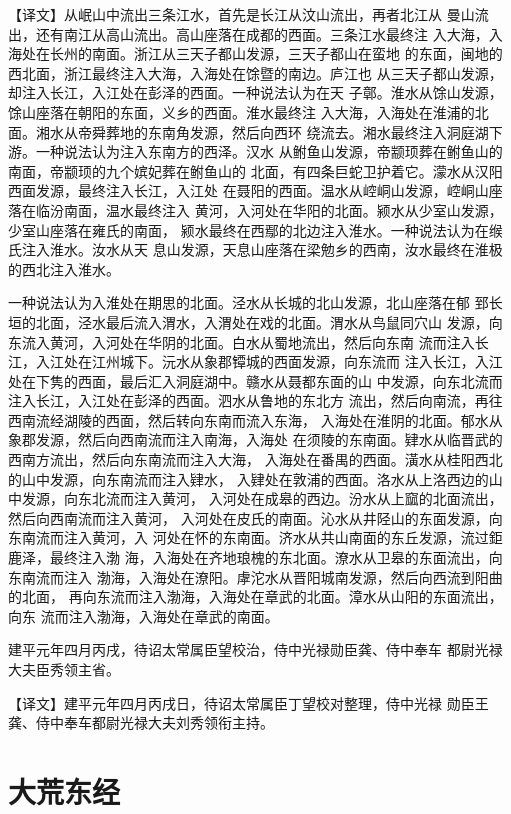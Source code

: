 \documentclass[a4paper,12pt,UTF8,twoside]{ctexbook}
\begin{document}
【译文】从岷山中流出三条江水，首先是长江从汶山流出，再者北江从 曼山流出，还有南江从高山流出。高山座落在成都的西面。三条江水最终注 入大海，入海处在长州的南面。浙江从三天子都山发源，三天子都山在蛮地 的东面，闽地的西北面，浙江最终注入大海，入海处在馀暨的南边。庐江也 从三天子都山发源，却注入长江，入江处在彭泽的西面。一种说法认为在天 子鄣。淮水从馀山发源，馀山座落在朝阳的东面，义乡的西面。淮水最终注 入大海，入海处在淮浦的北面。湘水从帝舜葬地的东南角发源，然后向西环 绕流去。湘水最终注入洞庭湖下游。一种说法认为注入东南方的西泽。汉水 从鲋鱼山发源，帝颛顼葬在鲋鱼山的南面，帝颛顼的九个嫔妃葬在鲋鱼山的 北面，有四条巨蛇卫护着它。濛水从汉阳西面发源，最终注入长江，入江处 在聂阳的西面。温水从崆峒山发源，崆峒山座落在临汾南面，温水最终注入 黄河，入河处在华阳的北面。颍水从少室山发源，少室山座落在雍氏的南面， 颍水最终在西鄢的北边注入淮水。一种说法认为在缑氏注入淮水。汝水从天 息山发源，天息山座落在梁勉乡的西南，汝水最终在淮极的西北注入淮水。

一种说法认为入淮处在期思的北面。泾水从长城的北山发源，北山座落在郁 郅长垣的北面，泾水最后流入渭水，入渭处在戏的北面。渭水从鸟鼠同穴山 发源，向东流入黄河，入河处在华阴的北面。白水从蜀地流出，然后向东南 流而注入长江，入江处在江州城下。沅水从象郡镡城的西面发源，向东流而 注入长江，入江处在下隽的西面，最后汇入洞庭湖中。赣水从聂都东面的山 中发源，向东北流而注入长江，入江处在彭泽的西面。泗水从鲁地的东北方 流出，然后向南流，再往西南流经湖陵的西面，然后转向东南而流入东海， 入海处在淮阴的北面。郁水从象郡发源，然后向西南流而注入南海，入海处 在须陵的东南面。肄水从临晋武的西南方流出，然后向东南流而注入大海， 入海处在番禺的西面。潢水从桂阳西北的山中发源，向东南流而注入肄水， 入肄处在敦浦的西面。洛水从上洛西边的山中发源，向东北流而注入黄河， 入河处在成皋的西边。汾水从上窳的北面流出，然后向西南流而注入黄河， 入河处在皮氏的南面。沁水从井陉山的东面发源，向东南流而注入黄河，入 河处在怀的东南面。济水从共山南面的东丘发源，流过鉅鹿泽，最终注入渤 海，入海处在齐地琅槐的东北面。潦水从卫皋的东面流出，向东南流而注入 渤海，入海处在潦阳。虖沱水从晋阳城南发源，然后向西流到阳曲的北面， 再向东流而注入渤海，入海处在章武的北面。漳水从山阳的东面流出，向东 流而注入渤海，入海处在章武的南面。

建平元年四月丙戌，待诏太常属臣望校治，侍中光禄勋臣龚、侍中奉车 都尉光禄大夫臣秀领主省。

【译文】建平元年四月丙戌日，待诏太常属臣丁望校对整理，侍中光禄 勋臣王龚、侍中奉车都尉光禄大夫刘秀领衔主持。

\chapter{大荒东经}
\end{document}
